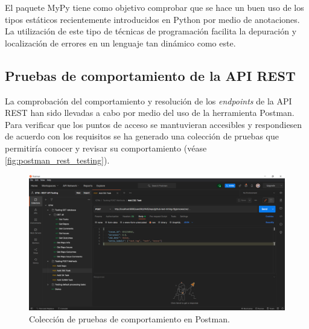 El paquete MyPy tiene como objetivo comprobar que se hace un buen uso de los tipos estáticos recientemente introducidos en Python por medio de anotaciones. La utilización de este tipo de técnicas de programación facilita la depuración y localización de errores en un lenguaje tan dinámico como este.

\subsection{Pruebas de comportamiento de la API REST}

La comprobación del comportamiento y resolución de los \textit{endpoints} de la API REST han sido llevadas a cabo por medio del uso de la herramienta Postman. Para verificar que los puntos de acceso se mantuvieran accesibles y respondiesen de acuerdo con los requisitos se ha generado una colección de pruebas que permitiría conocer y revisar su comportamiento (véase \autoref{fig:postman_rest_testing}).

\begin{figure}[!ht]
	\centering
    \includegraphics[width=\textwidth]{img/postman_rest_testing.png}
	\caption{Colección de pruebas de comportamiento en Postman.}
	\label{fig:postman_rest_testing}
\end{figure}